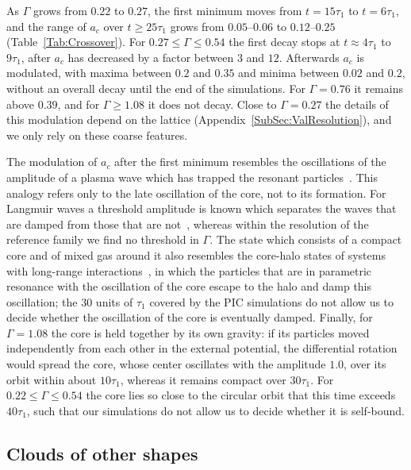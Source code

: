 As $\Gamma$ grows from $0.22$ to $0.27$, the first minimum moves from $t = 15\tau_1$ to $t = 6\tau_1$, and the range of $a_c$ over $t\geq 25\tau_1$ grows from $0.05$--$0.06$ to $0.12$--$0.25$ (Table~\ref{Tab:Crossover}). For $0.27\leq\Gamma\leq 0.54$ the first decay stops at $t\approx 4\tau_1$ to $9\tau_1$, after $a_c$ has decreased by a factor between $3$ and $12$. Afterwards $a_c$ is modulated, with maxima between $0.2$ and $0.35$ and minima between $0.02$ and $0.2$, without an overall decay until the end of the simulations. For $\Gamma = 0.76$ it remains above $0.39$, and for $\Gamma\geq 1.08$ it does not decay. Close to $\Gamma = 0.27$ the details of this modulation depend on the lattice (Appendix~\ref{SubSec:ValResolution}), and we only rely on these coarse features.

The modulation of $a_c$ after the first minimum resembles the oscillations of the amplitude of a plasma wave which has trapped the resonant particles~\cite{tO65}. This analogy refers only to the late oscillation of the core, not to its formation. For Langmuir waves a threshold amplitude is known which separates the waves that are damped from those that are not~\cite{aIiC06}, whereas within the resolution of the reference family we find no threshold in $\Gamma$. The state which consists of a compact core and of mixed gas around it also resembles the core-halo states of systems with long-range interactions~\cite{yLrPfRtTfB14}, in which the particles that are in parametric resonance with the oscillation of the core escape to the halo and damp this oscillation; the $30$ units of $\tau_1$ covered by the PIC simulations do not allow us to decide whether the oscillation of the core is eventually damped. Finally, for $\Gamma = 1.08$ the core is held together by its own gravity: if its particles moved independently from each other in the external potential, the differential rotation would spread the core, whose center oscillates with the amplitude $1.0$, over its orbit within about $10\tau_1$, whereas it remains compact over $30\tau_1$. For $0.22\leq\Gamma\leq 0.54$ the core lies so close to the circular orbit that this time exceeds $40\tau_1$, such that our simulations do not allow us to decide whether it is self-bound.

\subsection{Clouds of other shapes}
\label{SubSec:EpiProfiles}

